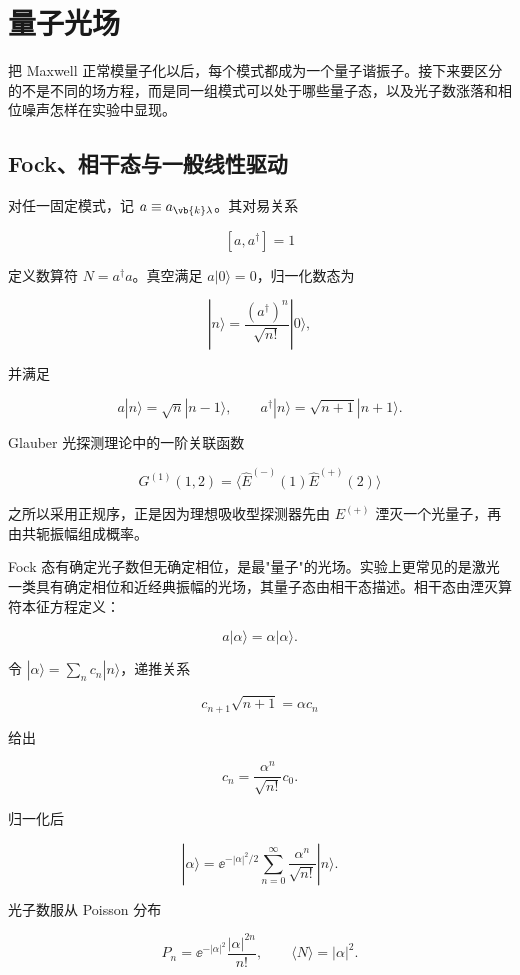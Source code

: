 \section{量子光场}
\label{chap:quantum-light-states}

把 Maxwell 正常模量子化以后，每个模式都成为一个量子谐振子。接下来要区分的不是不同的场方程，而是同一组模式可以处于哪些量子态，以及光子数涨落和相位噪声怎样在实验中显现。

\subsection{Fock、相干态与一般线性驱动}
对任一固定模式，记 \(a\equiv a_{\vb{k}\lambda}\)。其对易关系

\[
[a,a^\dagger]=1
\]

定义数算符 \(N=a^\dagger a\)。真空满足 \(a|0\rangle=0\)，归一化数态为

\[
|n\rangle
=\frac{(a^\dagger)^n}{\sqrt{n!}}|0\rangle,
\]

并满足

\[
a|n\rangle=\sqrt n|n-1\rangle,
\qquad
a^\dagger|n\rangle=\sqrt{n+1}|n+1\rangle.
\]

Glauber 光探测理论中的一阶关联函数

\[
G^{(1)}(1,2)
=\langle\hat E^{(-)}(1)\hat E^{(+)}(2)\rangle
\]

之所以采用正规序，正是因为理想吸收型探测器先由 \(E^{(+)}\) 湮灭一个光量子，再由共轭振幅组成概率。

Fock 态有确定光子数但无确定相位，是最"量子"的光场。实验上更常见的是激光一类具有确定相位和近经典振幅的光场，其量子态由相干态描述。相干态由湮灭算符本征方程定义：

\[
a|\alpha\rangle=\alpha|\alpha\rangle.
\]

令 \(|\alpha\rangle=\sum_nc_n|n\rangle\)，递推关系

\[
c_{n+1}\sqrt{n+1}=\alpha c_n
\]

给出

\[
c_n=\frac{\alpha^n}{\sqrt{n!}}c_0.
\]

归一化后

\[
|\alpha\rangle
=\ee^{-|\alpha|^2/2}
\sum_{n=0}^{\infty}
\frac{\alpha^n}{\sqrt{n!}}|n\rangle.
\]

光子数服从 Poisson 分布

\[
P_n=\ee^{-|\alpha|^2}\frac{|\alpha|^{2n}}{n!},
\qquad
\langle N\rangle=|\alpha|^2.
\]

